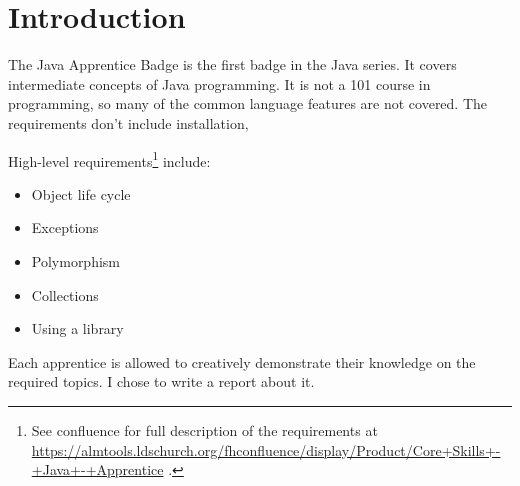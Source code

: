 \section*{Introduction} %


The Java Apprentice Badge is the first badge in the Java series. It covers intermediate concepts of Java programming. It is not a 101 course in programming, so many of the common language features are not covered. The requirements don't include installation, 

High-level requirements\footnote{See confluence for full description of the requirements at \url{https://almtools.ldschurch.org/fhconfluence/display/Product/Core+Skills+-+Java+-+Apprentice} .} include:
\begin{itemize}
\item Object life cycle
\item Exceptions
\item Polymorphism
\item Collections
\item Using a library
\end{itemize}

Each apprentice is allowed to creatively demonstrate their knowledge on the required topics. I chose to write a report about it.